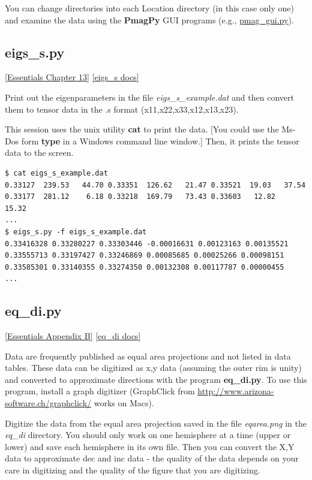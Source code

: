 \documentclass[11pt]{book}
\begin{document}
{{You can change directories into each Location directory (in this case only one) and examine the data using the {\bf PmagPy} GUI programs (e.g., \href{#pmag_gui.py}{pmag_gui.py}).


\subsection{eigs\_s.py}
\href{http://earthref.org/MAGIC/books/Tauxe/Essentials/WebBook3ch13.html#ch13}{ [Essentials Chapter 13]}
\href{https://github.com/PmagPy/PmagPy/blob/master/programs/eigs_s.py}{[eigs\_s docs]}

Print out the eigenparameters  in the file {\it eigs\_s\_example.dat} and then
convert them to tensor data in the .s format (x11,x22,x33,x12,x13,x23).

This session uses the unix utility {\bf cat} to print the data.  [You could use the Ms-Dos
form {\bf type} in a Windows command line window.]    Then, it prints the tensor data to the screen.

\begin{verbatim}
$ cat eigs_s_example.dat
0.33127  239.53   44.70 0.33351  126.62   21.47 0.33521  19.03   37.54
0.33177  281.12    6.18 0.33218  169.79   73.43 0.33603   12.82   15.32
...
$ eigs_s.py -f eigs_s_example.dat
0.33416328 0.33280227 0.33303446 -0.00016631 0.00123163 0.00135521
0.33555713 0.33197427 0.33246869 0.00085685 0.00025266 0.00098151
0.33585301 0.33140355 0.33274350 0.00132308 0.00117787 0.00000455
...
\end{verbatim}

\subsection{eq\_di.py}
\href{http://earthref.org/MAGIC/books/Tauxe/Essentials/WebBook3.html#equal_area}{[Essentials Appendix B]}
\href{https://github.com/PmagPy/PmagPy/blob/master/programs/eq_di.py}{[eq\_di docs]}

Data are frequently  published as equal area projections and not listed in data tables.  These data can be digitized as x,y data (assuming the outer rim is unity) and converted to approximate directions with the program {\bf eq\_di.py}.  To use this program, install a graph digitizer (GraphClick from \url{http://www.arizona-software.ch/graphclick/} works on Macs).

Digitize the data from the equal area projection saved in the file {\it eqarea.png} in the {\it eq\_di} directory.
You should only work on one hemisphere at a time (upper or lower) and save each hemisphere in its own file.  Then you can convert the X,Y data to approximate dec and inc data - the quality of the data depends on your care in digitizing and the quality of the figure that you are digitizing.

}}
\end{document}
